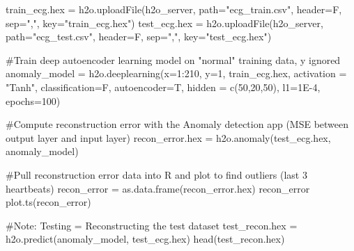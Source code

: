 \documentclass[11pt]{article}
\begin{document}
\begin{spverbatim}

train_ecg.hex = h2o.uploadFile(h2o_server, path="ecg_train.csv", header=F, sep=",", key="train_ecg.hex") 
test_ecg.hex = h2o.uploadFile(h2o_server, path="ecg_test.csv", header=F, sep=",", key="test_ecg.hex") 

#Train deep autoencoder learning model on "normal" training data, y ignored 
anomaly_model = h2o.deeplearning(x=1:210, y=1, train_ecg.hex, activation = "Tanh", classification=F, autoencoder=T, hidden = c(50,20,50), l1=1E-4, 
epochs=100)                 
                              
#Compute reconstruction error with the Anomaly detection app (MSE between
output layer and input layer)
recon_error.hex = h2o.anomaly(test_ecg.hex, anomaly_model)
                              
#Pull reconstruction error data into R and plot to find outliers (last 3
heartbeats)
recon_error = as.data.frame(recon_error.hex)
recon_error
plot.ts(recon_error)

#Note: Testing = Reconstructing the test dataset
test_recon.hex = h2o.predict(anomaly_model, test_ecg.hex) 
head(test_recon.hex)              

\end{spverbatim}
\noindent

\newpage
\end{document}
